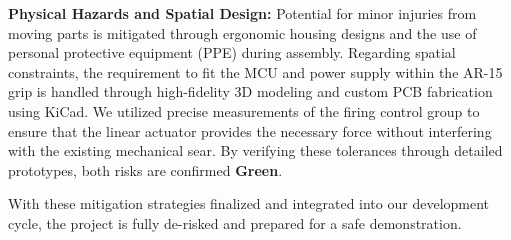 \textbf{Physical Hazards and Spatial Design:} Potential for minor injuries from moving parts is mitigated through ergonomic housing designs and the use of personal protective equipment (PPE) during assembly. Regarding spatial constraints, the requirement to fit the MCU and power supply within the AR-15 grip is handled through high-fidelity 3D modeling and custom PCB fabrication using KiCad. We utilized precise measurements of the firing control group to ensure that the linear actuator provides the necessary force without interfering with the existing mechanical sear. By verifying these tolerances through detailed prototypes, both risks are confirmed \textbf{Green}.

With these mitigation strategies finalized and integrated into our development cycle, the project is fully de-risked and prepared for a safe demonstration.